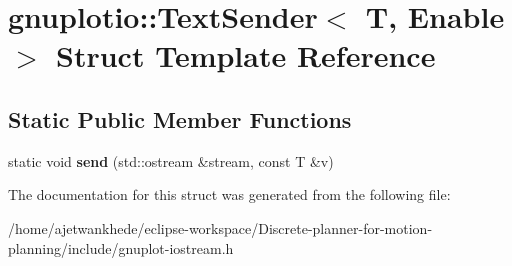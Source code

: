 \hypertarget{structgnuplotio_1_1TextSender}{}\section{gnuplotio\+:\+:Text\+Sender$<$ T, Enable $>$ Struct Template Reference}
\label{structgnuplotio_1_1TextSender}
\subsection*{Static Public Member Functions}
\begin{DoxyCompactItemize}
\item 
\mbox{\label{structgnuplotio_1_1TextSender_a03b58292dc75a4137d30ad7fffd762c6}} 
static void {\bfseries send} (std\+::ostream \&stream, const T \&v)
\end{DoxyCompactItemize}


The documentation for this struct was generated from the following file\+:\begin{DoxyCompactItemize}
\item 
/home/ajetwankhede/eclipse-\/workspace/\+Discrete-\/planner-\/for-\/motion-\/planning/include/gnuplot-\/iostream.\+h\end{DoxyCompactItemize}
